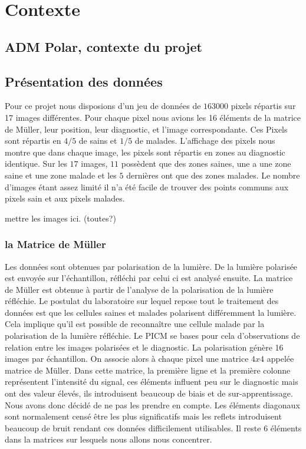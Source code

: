\documentclass[a4paper,10pt]{report}
\begin{document}
\chapter{Contexte}
\section{ADM Polar, contexte du projet}
\section{Présentation des données}
Pour ce projet nous disposions d'un jeu de données de $163 000$ pixels répartis sur 17 images différentes. Pour chaque pixel nous avions les 16 éléments de la matrice de Müller, leur position, leur diagnostic, et l'image correspondante.
Ces Pixels sont répartis en $4/5$ de sains et $1/5$ de malades. L'affichage des pixels nous montre que dans chaque image, les pixels sont répartis en zones au diagnostic identique. Sur les $17$ images, $11$ possèdent que des zones saines, une a une zone saine et une zone malade et les $5$ dernières ont que des zones malades. Le nombre d'images étant assez limité il n'a été facile de trouver des points communs aux pixels sain et aux pixels malades.


mettre les images ici. (toutes?)

\subsection{la Matrice de Müller}
Les données sont obtenues par polarisation de la lumière. De la lumière polarisée est envoyée sur l'échantillon, réfléchi par celui ci est analysé ensuite.
La matrice de Müller est obtenue à partir de l'analyse de la polarisation de la lumière réfléchie. Le postulat du laboratoire sur lequel repose tout le traitement des données est que les cellules saines et malades polarisent différemment la lumière. Cela implique qu'il est possible de reconnaître une cellule malade par la polarisation de la lumière réfléchie.
Le PICM se bases pour cela d'observations de relation entre les images polarisées et le diagnostic. 
La polarisation génère 16 images par échantillon. On associe alors à chaque pixel une matrice $4x4$ appelée matrice de Müller. Dans cette matrice, la première ligne et la première colonne représentent l'intensité du signal, ces éléments influent peu sur le diagnostic mais ont des valeur élevés, ils introduisent beaucoup de biais et de sur-apprentissage. Nous avons donc décidé de ne pas les prendre en compte. Les éléments diagonaux sont normalement censé être les plus significatifs mais les reflets introduisent beaucoup de bruit rendant ces données difficilement utilisables. Il reste 6 éléments dans la matrices sur lesquels nous allons nous concentrer. 
\end{document}
